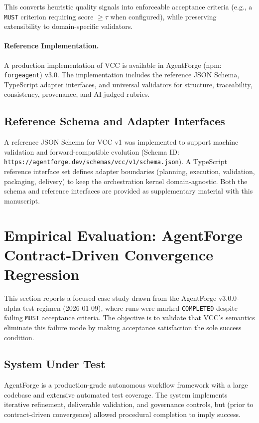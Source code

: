\documentclass[11pt]{article}
\begin{document}
This converts heuristic quality signals into enforceable acceptance criteria (e.g., a \texttt{MUST} criterion requiring score $\geq \tau$ when configured), while preserving extensibility to domain-specific validators.

\paragraph{Reference Implementation.} A production implementation of VCC is available in AgentForge (npm: \texttt{forgeagent}) v3.0. The implementation includes the reference JSON Schema, TypeScript adapter interfaces, and universal validators for structure, traceability, consistency, provenance, and AI-judged rubrics.

\subsection{Reference Schema and Adapter Interfaces}
A reference JSON Schema for VCC v1 was implemented to support machine validation and forward-compatible evolution (Schema ID: \texttt{https://agentforge.dev/schemas/vcc/v1/schema.json}).
A TypeScript reference interface set defines adapter boundaries (planning, execution, validation, packaging, delivery) to keep the orchestration kernel domain-agnostic.
Both the schema and reference interfaces are provided as supplementary material with this manuscript.

\section{Empirical Evaluation: AgentForge Contract-Driven Convergence Regression}

This section reports a focused case study drawn from the AgentForge v3.0.0-alpha test regimen (2026-01-09), where runs were marked \texttt{COMPLETED} despite failing \texttt{MUST} acceptance criteria. The objective is to validate that VCC's semantics eliminate this failure mode by making acceptance satisfaction the sole success condition.

\subsection{System Under Test}
AgentForge is a production-grade autonomous workflow framework with a large codebase and extensive automated test coverage. The system implements iterative refinement, deliverable validation, and governance controls, but (prior to contract-driven convergence) allowed procedural completion to imply success.
\end{document}
